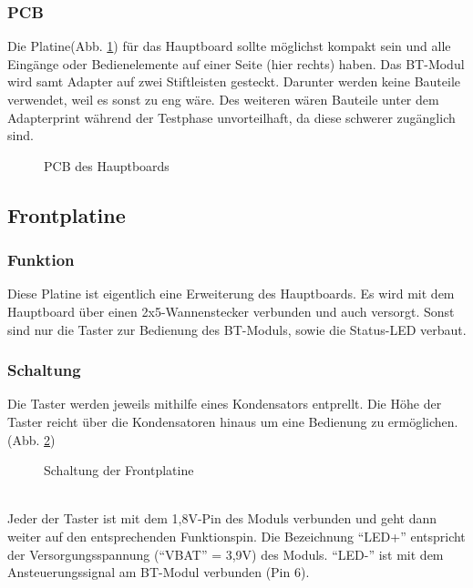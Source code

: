 \subsubsection{PCB}
Die Platine(Abb. \ref {fig:abb3.6}) für das Hauptboard sollte möglichst kompakt sein und alle Eingänge oder Bedienelemente auf einer Seite (hier rechts) haben. Das BT-Modul wird samt Adapter auf zwei Stiftleisten gesteckt. Darunter werden keine Bauteile verwendet, weil es sonst zu eng wäre. Des weiteren wären Bauteile unter dem Adapterprint während der Testphase unvorteilhaft, da diese schwerer zugänglich sind.
\begin{figure} [h]
	\centering
	\caption{PCB des Hauptboards}\label {fig:abb3.6}
\end{figure}
\newpage


\subsection{Frontplatine}
\subsubsection{Funktion}
Diese Platine ist eigentlich eine Erweiterung des Hauptboards. Es wird mit dem Hauptboard über einen 2x5-Wannenstecker verbunden und auch versorgt. Sonst sind nur die Taster zur Bedienung des BT-Moduls, sowie die Status-LED verbaut.

\subsubsection{Schaltung}
Die Taster werden jeweils mithilfe eines Kondensators entprellt. Die Höhe der Taster reicht über die Kondensatoren hinaus um eine Bedienung zu ermöglichen. (Abb. \ref{fig:abb3.7})
\begin{figure} [h]
	\centering
	\caption{Schaltung der Frontplatine}\label {fig:abb3.7}
\end{figure} \\
Jeder der Taster ist mit dem 1,8V-Pin des Moduls verbunden und geht dann weiter auf den entsprechenden Funktionspin. Die Bezeichnung \enquote{LED+} entspricht der Versorgungsspannung (\enquote{VBAT} = 3,9V) des Moduls. \enquote{LED-} ist mit dem Ansteuerungssignal am BT-Modul verbunden (Pin 6).

